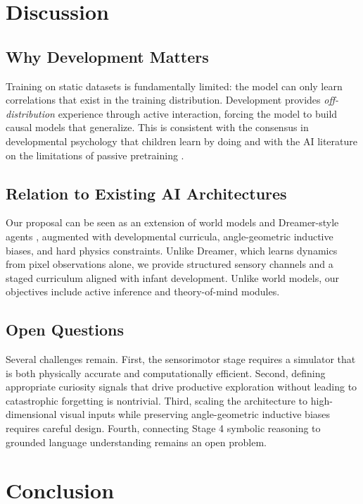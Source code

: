 \documentclass[11pt,oneside]{article}
\begin{document}
\section{Discussion}

\subsection{Why Development Matters}

Training on static datasets is fundamentally limited: the model can only learn correlations that exist in the training distribution. Development provides \emph{off-distribution} experience through active interaction, forcing the model to build causal models that generalize. This is consistent with the consensus in developmental psychology that children learn by doing \citep{gopnik2012scientist} and with the AI literature on the limitations of passive pretraining \citep{lake2017building}.

\subsection{Relation to Existing AI Architectures}

Our proposal can be seen as an extension of world models \citep{ha2018world} and Dreamer-style agents \citep{ha2020dream}, augmented with developmental curricula, angle-geometric inductive biases, and hard physics constraints. Unlike Dreamer, which learns dynamics from pixel observations alone, we provide structured sensory channels and a staged curriculum aligned with infant development. Unlike world models, our objectives include active inference and theory-of-mind modules.

\subsection{Open Questions}

Several challenges remain. First, the sensorimotor stage requires a simulator that is both physically accurate and computationally efficient. Second, defining appropriate curiosity signals that drive productive exploration without leading to catastrophic forgetting is nontrivial. Third, scaling the architecture to high-dimensional visual inputs while preserving angle-geometric inductive biases requires careful design. Fourth, connecting Stage 4 symbolic reasoning to grounded language understanding remains an open problem.

\section{Conclusion}
\end{document}
